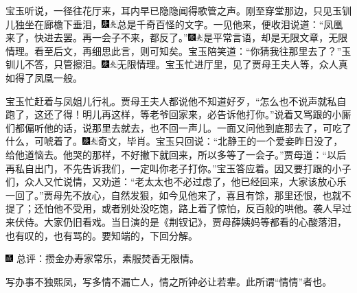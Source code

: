 宝玉听说，一径往花厅来，耳内早已隐隐闻得歌管之声。刚至穿堂那边，只见玉钏儿独坐在廊檐下垂泪，{\includegraphics[width=3mm]{../Images/00004}\includegraphics[width=3mm]{../Images/00012}\footnotesize \kaishu 总是千奇百怪的文字。}一见他来，便收泪说道：“凤凰来了，快进去罢。再一会子不来，都反了。”{\includegraphics[width=3mm]{../Images/00004}\includegraphics[width=3mm]{../Images/00012}\footnotesize \kaishu 是平常言语，却是无限文章，无限情理。看至后文，再细思此言，则可知矣。}宝玉陪笑道：“你猜我往那里去了？”玉钏儿不答，只管擦泪。{\includegraphics[width=3mm]{../Images/00004}\includegraphics[width=3mm]{../Images/00012}\footnotesize \kaishu 无限情理。}宝玉忙进厅里，见了贾母王夫人等，众人真如得了凤凰一般。

宝玉忙赶着与凤姐儿行礼。贾母王夫人都说他不知道好歹，“怎么也不说声就私自跑了，这还了得！明儿再这样，等老爷回家来，必告诉他打你。”说着又骂跟的小厮们都偏听他的话，说那里去就去，也不回一声儿。一面又问他到底那去了，可吃了什么，可唬着了。{\includegraphics[width=3mm]{../Images/00004}\includegraphics[width=3mm]{../Images/00012}\footnotesize \kaishu 奇文，毕肖。}宝玉只回说：“北静王的一个爱妾昨日没了，给他道恼去。他哭的那样，不好撇下就回来，所以多等了一会子。”贾母道：“以后再私自出门，不先告诉我们，一定叫你老子打你。”宝玉答应着。因又要打跟的小子们，众人又忙说情，又劝道：“老太太也不必过虑了，他已经回来，大家该放心乐一回了。”贾母先不放心，自然发狠，如今见他来了，喜且有馀，那里还恨，也就不提了；还怕他不受用，或者别处没吃饱，路上着了惊怕，反百般的哄他。袭人早过来伏侍。大家仍旧看戏。当日演的是《荆钗记》，贾母薛姨妈等都看的心酸落泪，也有叹的，也有骂的。要知端的，下回分解。

{\includegraphics[width=3mm]{../Images/00005} \kaishu 总评：攒金办寿家常乐，素服焚香无限情。}

{写办事不独熙凤，写多情不漏亡人，情之所钟必让若辈。此所谓“情情”者也。}
